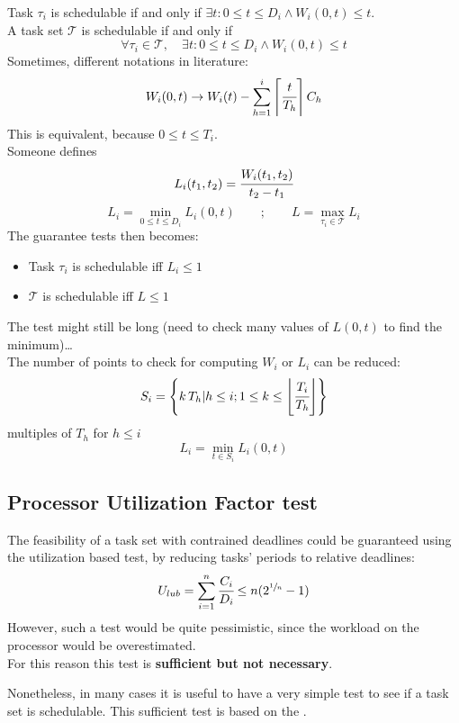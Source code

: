     Task $\tau_i$ is schedulable if and only if $\exists t : 0 \le t \le D_i \wedge W_i(0,t) \le t$.\\
    A task set $\mathcal{T}$ is schedulable if and only if
    \[\forall \tau_i \in \mathcal{T},\quad \exists t : 0 \le t \le D_i \wedge W_i(0,t) \le t\]
    Sometimes, different notations in literature:
    \[W_i(0,t)\rightarrow W_i(t) - \sum_{h=1}^i \left\lceil \cfrac{t}{T_h} \right\rceil C_h\]
    This is equivalent, because $0 \le t \le T_i$.\\
    Someone defines 
    \[L_i(t_1,t_2) = \cfrac{W_i(t_1, t_2)}{t_2 - t_1}\]
    \[L_i = \min_{0\le t\le D_i} L_i(0,t)\qquad;\qquad L = \max_{\tau_i \in \mathcal{T}} L_i\]
    The guarantee tests then becomes:
    \begin{itemize}
        \item Task $\tau_i$ is schedulable iff $L_i \le 1$
        \item $\mathcal{T}$ is schedulable iff $L \le 1$
    \end{itemize}
    The test might still be long (need to check many values of $L(0,t)$ to find the minimum)\dots\\
    The number of points to check for computing $W_i$ or $L_i$ can be reduced:
    \[S_i = \left\{k\,T_h | h \le i; 1 \le k \le \left\lfloor \cfrac{T_i}{T_h} \right\rfloor\right\}\]
    multiples of $T_h$ for $h \le i$
    \[L_i = \min_{t\in S_i} L_i(0,t)\]


\subsection{Processor Utilization Factor test}
The feasibility of a task set with contrained deadlines could be guaranteed using the utilization based test, by reducing tasks' periods to relative deadlines:
\[U_{lub} = \sum_{i=1}^n \cfrac{C_i}{D_i} \le n(2^{\sfrac{1}{n}}-1)\]
However, such a test would be quite pessimistic, since the workload on the processor would be overestimated.\\
For this reason this test is \textbf{sufficient but not necessary}.

Nonetheless, in many cases it is useful to have a very simple test to see if a task set is schedulable.
This sufficient test is based on the .

